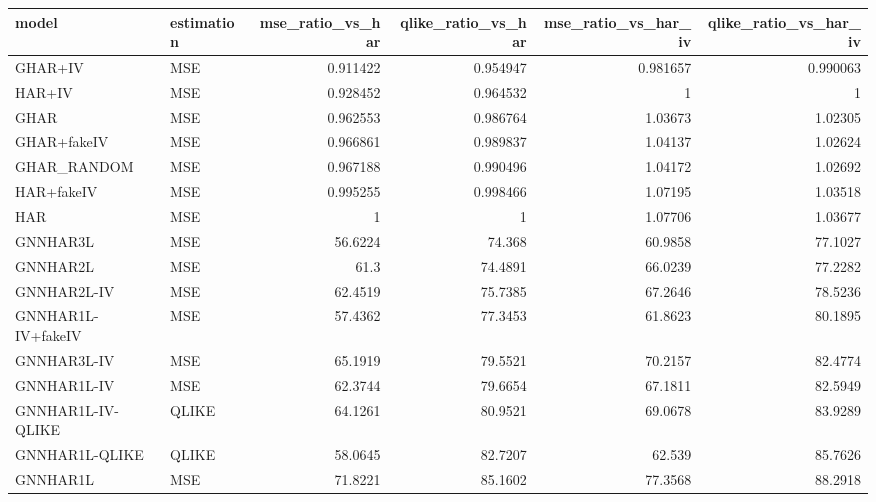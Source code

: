 \begin{tabular}{llrrrr}
\toprule
model & estimation & mse_ratio_vs_har & qlike_ratio_vs_har & mse_ratio_vs_har_iv & qlike_ratio_vs_har_iv \\
\midrule
GHAR+IV & MSE & 0.911422 & 0.954947 & 0.981657 & 0.990063 \\
HAR+IV & MSE & 0.928452 & 0.964532 & 1 & 1 \\
GHAR & MSE & 0.962553 & 0.986764 & 1.03673 & 1.02305 \\
GHAR+fakeIV & MSE & 0.966861 & 0.989837 & 1.04137 & 1.02624 \\
GHAR_RANDOM & MSE & 0.967188 & 0.990496 & 1.04172 & 1.02692 \\
HAR+fakeIV & MSE & 0.995255 & 0.998466 & 1.07195 & 1.03518 \\
HAR & MSE & 1 & 1 & 1.07706 & 1.03677 \\
GNNHAR3L & MSE & 56.6224 & 74.368 & 60.9858 & 77.1027 \\
GNNHAR2L & MSE & 61.3 & 74.4891 & 66.0239 & 77.2282 \\
GNNHAR2L-IV & MSE & 62.4519 & 75.7385 & 67.2646 & 78.5236 \\
GNNHAR1L-IV+fakeIV & MSE & 57.4362 & 77.3453 & 61.8623 & 80.1895 \\
GNNHAR3L-IV & MSE & 65.1919 & 79.5521 & 70.2157 & 82.4774 \\
GNNHAR1L-IV & MSE & 62.3744 & 79.6654 & 67.1811 & 82.5949 \\
GNNHAR1L-IV-QLIKE & QLIKE & 64.1261 & 80.9521 & 69.0678 & 83.9289 \\
GNNHAR1L-QLIKE & QLIKE & 58.0645 & 82.7207 & 62.539 & 85.7626 \\
GNNHAR1L & MSE & 71.8221 & 85.1602 & 77.3568 & 88.2918 \\
\bottomrule
\end{tabular}
